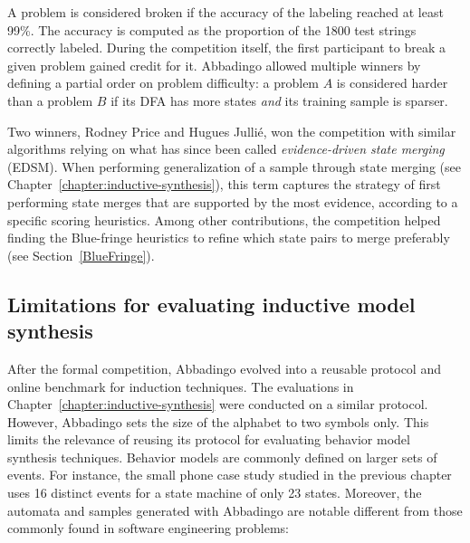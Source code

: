 A problem is considered broken if the accuracy of the labeling reached at least 99\%. The accuracy is computed as the proportion of the 1800 test strings correctly labeled. During the competition itself, the first participant to break a given problem gained credit for it. Abbadingo allowed multiple winners by defining a partial order on problem difficulty: a problem $A$ is considered harder than a problem $B$ if its DFA has more states \emph{and} its training sample is sparser. 

Two winners, Rodney Price and Hugues Julli\'e, won the competition with similar algorithms relying on what has since been called \emph{evidence-driven state merging} (EDSM). When performing generalization of a sample through state merging (see Chapter~\ref{chapter:inductive-synthesis}), this term captures the strategy of first performing state merges that are supported by the most evidence, according to a specific scoring heuristics. Among other contributions, the competition helped finding the Blue-fringe heuristics to refine which state pairs to merge preferably (see Section~\ref{BlueFringe}).

\subsection{Limitations for evaluating inductive model synthesis}

After the formal competition, Abbadingo evolved into a reusable protocol and online benchmark for induction techniques. The evaluations in Chapter~\ref{chapter:inductive-synthesis} were conducted on a similar protocol. However, Abbadingo sets the size of the alphabet to two symbols only. This limits the relevance of reusing its protocol for evaluating behavior model synthesis techniques. Behavior models are commonly defined on larger sets of events. For instance, the small phone case study studied in the previous chapter uses 16 distinct events for a state machine of only 23 states. Moreover, the automata and samples generated with Abbadingo are notable different from those commonly found in software engineering problems:

